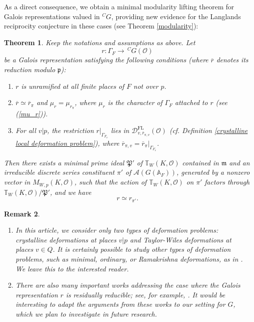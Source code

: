 \documentclass[12pt,oneside,reqno]{amsart}
\theoremstyle{plain}
\newtheorem{theorem}{Theorem}[section]
\newtheorem{remark}[theorem]{Remark}
\begin{document}
	As a direct consequence, we obtain a minimal modularity lifting theorem for Galois representations valued in ${}^C G$, providing new evidence for the Langlands reciprocity conjecture in these cases (see Theorem \ref{modularity}):
	
	\begin{theorem}\label{main theorem-2}
		Keep the notations and assumptions as above. Let
		\[
		r\colon
		\Gamma_F
		\rightarrow
		\,^C
		G(\mathcal{O})
		\]
		be a Galois representation satisfying the following conditions (where $\overline{r}$ denotes
		its reduction modulo $\mathfrak{p}$):
		\begin{enumerate}
			\item
			$r$ is unramified at all finite places of $F$ not over $p$.
			
			\item 
			$\overline{r} \simeq \overline{r}_{\pi}$ and $\mu_r = \mu_{r_\pi}$, where $\mu_r$ is the character of $\Gamma_{F}$ attached to $r$ (see (\ref{mu_r})).
			
			\item 
			For all $v | p$, the restriction $r|_{\Gamma_{F_v}}$ lies in $\mathcal{D}^\mathrm{FL}_{v,\overline{r}_{\pi,v}}(\mathcal{O})$ (\emph{cf.} Definition \ref{crystalline local deformation problem}), where $\overline{r}_{\pi,v} = \overline{r}_\pi|_{\Gamma_{F_v}}$.
		\end{enumerate}
		
		Then there exists a minimal prime ideal $\mathfrak{P}'$ of $\mathbb{T}_W(K,\mathcal{O})$ contained in $\mathfrak{m}$ and an irreducible discrete series constituent $\pi'$ of $\mathcal{A}(G(\mathbb{A}_F))$, generated by a nonzero vector in  $M_{W,p}(K,\mathcal{O})$, such that the action of $\mathbb{T}_W(K,\mathcal{O})$ on $\pi'$ factors through $\mathbb{T}_W(K,\mathcal{O})/\mathfrak{P}'$, and we have
		\[
		r\simeq
		r_{\pi'}.
		\]
	\end{theorem}
	
	
	
	\begin{remark}\rm
		\begin{enumerate}
			\item 
			In this article, we consider only two types of deformation problems: crystalline deformations at places $v | p$ and Taylor-Wiles deformations at places $v \in Q$. It is certainly possible to study other types of deformation problems, such as minimal, ordinary, or Ramakrishna deformations, as in \cite[§2.4]{ClozelHarrisTaylor2008}. We leave this to the interested reader.
			
			\item 
			There are also many important works addressing the case where the Galois representation $r$ is residually reducible; see, for example, \cite{Thorne2015,FakhruddinKharePatrikis2022}. It would be interesting to adapt the arguments from these works to our setting for $G$, which we plan to investigate in future research.
		\end{enumerate}
	\end{remark}
	
\end{document}
